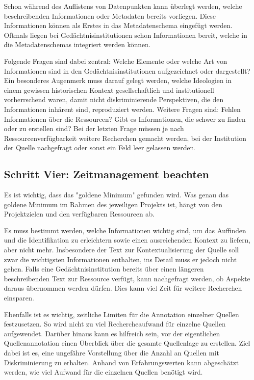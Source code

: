\documentclass[
  letterpaper,
  DIV=11,
  numbers=noendperiod]{scrartcl}
\begin{document}
Schon während des Auflistens von Datenpunkten kann überlegt werden,
welche beschreibenden Informationen oder Metadaten bereits vorliegen.
Diese Informationen können als Erstes in das Metadatenschema eingefügt
werden. Oftmals liegen bei Gedächtnisinstitutionen schon Informationen
bereit, welche in die Metadatenschemas integriert werden können.

Folgende Fragen sind dabei zentral: Welche Elemente oder welche Art von
Informationen sind in den Gedächtnisinstitutionen aufgezeichnet oder
dargestellt? Ein besonderes Augenmerk muss darauf gelegt werden, welche
Ideologien in einem gewissen historischen Kontext gesellschaftlich und
institutionell vorherrschend waren, damit nicht diskriminierende
Perspektiven, die den Informationen inhärent sind, reproduziert werden.
Weitere Fragen sind: Fehlen Informationen über die Ressourcen? Gibt es
Informationen, die schwer zu finden oder zu erstellen sind? Bei der
letzten Frage müssen je nach Ressourcenverfügbarkeit weitere Recherchen
gemacht werden, bei der Institution der Quelle nachgefragt oder sonst
ein Feld leer gelassen werden.

\subsection{Schritt Vier: Zeitmanagement
beachten~~}\label{schritt-vier-zeitmanagement-beachten}

Es ist wichtig, dass das "goldene Minimum" gefunden wird. Was genau das
goldene Minimum im Rahmen des jeweiligen Projekts ist, hängt von den
Projektzielen und den verfügbaren Ressourcen ab.

Es muss bestimmt werden, welche Informationen wichtig sind, um das
Auffinden und die Identifikation zu erleichtern sowie einen
ausreichenden Kontext zu liefern, aber nicht mehr. Insbesondere der Text
zur Kontextualisierung der Quelle soll zwar die wichtigsten
Informationen enthalten, ins Detail muss er jedoch nicht gehen. Falls
eine Gedächtnisinstitution bereits über einen längeren beschreibenden
Text zur Ressource verfügt, kann nachgefragt werden, ob Aspekte daraus
übernommen werden dürfen. Dies kann viel Zeit für weitere Recherchen
einsparen.

Ebenfalls ist es wichtig, zeitliche Limiten für die Annotation einzelner
Quellen festzusetzen. So wird nicht zu viel Rechercheaufwand für
einzelne Quellen aufgewendet. Darüber hinaus kann es hilfreich sein, vor
der eigentlichen Quellenannotation einen Überblick über die gesamte
Quellenlage zu erstellen. Ziel dabei ist es, eine ungefähre Vorstellung
über die Anzahl an Quellen mit Diskriminierung zu erhalten. Anhand von
Erfahrungswerten kann abgeschätzt werden, wie viel Aufwand für die
einzelnen Quellen benötigt wird.
\end{document}
